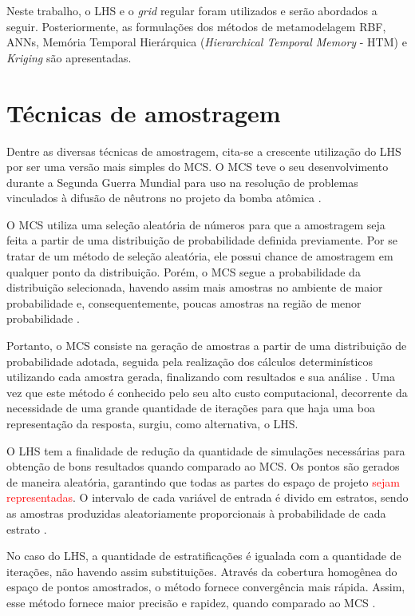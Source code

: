 Neste trabalho, o LHS e o {\it grid} regular foram utilizados e serão abordados a seguir. Posteriormente, as formulações dos métodos de metamodelagem RBF, ANNs, Memória Temporal Hierárquica (\textit{Hierarchical Temporal Memory} - HTM) e \textit{Kriging} são apresentadas.  

\section{Técnicas de amostragem}\label{Amostragem_D}

Dentre as diversas técnicas de amostragem, cita-se a crescente utilização do LHS por ser uma versão mais simples do MCS. O MCS teve o seu desenvolvimento durante a Segunda Guerra Mundial para uso na resolução de problemas vinculados à difusão de nêutrons no projeto da bomba atômica \cite{borges2008}. 

O MCS utiliza uma seleção aleatória de números para que a amostragem seja feita a partir de uma distribuição de probabilidade definida previamente. Por se tratar de um método de seleção aleatória, ele possui chance de amostragem em qualquer ponto da distribuição. Porém, o MCS segue a probabilidade da distribuição selecionada, havendo assim mais amostras no ambiente de maior probabilidade e, consequentemente, poucas amostras na região de menor probabilidade \cite{costa2016}.

Portanto, o MCS consiste na geração de amostras a partir de uma distribuição de probabilidade adotada, seguida pela realização dos cálculos determinísticos utilizando cada amostra gerada, finalizando com resultados e sua análise \cite{lima2011}. Uma vez que este método é conhecido pelo seu alto custo computacional, decorrente da necessidade de uma grande quantidade de iterações para que haja uma boa representação da resposta, surgiu, como alternativa, o LHS.

O LHS tem a finalidade de redução da quantidade de simulações necessárias para obtenção de bons resultados quando comparado ao MCS. Os pontos são gerados de maneira aleatória, garantindo que todas as partes do espaço de projeto \textcolor{red}{sejam representadas}. O intervalo de cada variável de entrada é divido em estratos, sendo as amostras produzidas aleatoriamente proporcionais à probabilidade de cada estrato \cite{queiroz2017}.

No caso do LHS, a quantidade de estratificações é igualada com a quantidade de iterações, não havendo assim substituições. Através da cobertura homogênea do espaço de pontos amostrados, o método fornece convergência mais rápida. Assim, esse método fornece maior precisão e rapidez, quando comparado ao MCS \cite{Pilger2005}.
 
